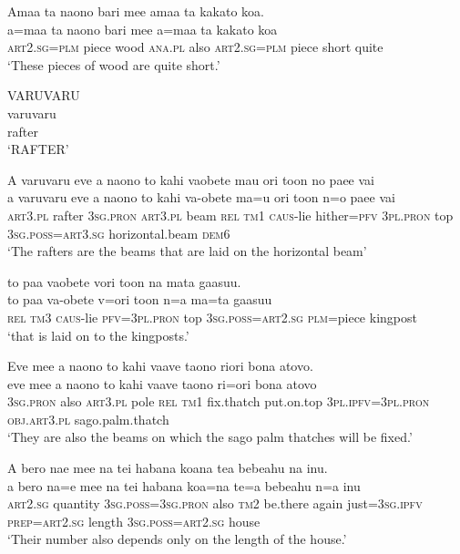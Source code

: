 \ea\label{ex:text11-24}
Amaa ta naono bari mee amaa ta kakato koa.\\
\gll a=maa	ta	naono	bari	mee	a=maa	ta	kakato	koa\\
     \textsc{art}2.\textsc{sg}=\textsc{plm}	piece	wood	\textsc{ana}.\textsc{pl}	also	\textsc{art}2.\textsc{sg}=\textsc{plm}	piece	short	quite\\
\glt `These pieces of wood are quite short.'
\z

\newpage
\ea\label{ex:text11-25}
VARUVARU\\
\gll varuvaru\\
     rafter\\
\glt `RAFTER'
\z

\ea\label{ex:text11-26}
A varuvaru eve a naono to kahi vaobete mau ori toon no paee vai\\
\gll a	varuvaru	eve	a	naono	to	kahi	va-obete	ma=u	ori	toon	n=o	paee	vai\\
     \textsc{art}3.\textsc{pl}	rafter	3\textsc{sg}.\textsc{pron}	\textsc{art}3.\textsc{pl}	beam	\textsc{rel}	\textsc{tm}1	\textsc{caus}-lie	hither=\textsc{pfv}	3\textsc{pl}.\textsc{pron}	top	3\textsc{sg}.\textsc{poss}=\textsc{art}3.\textsc{sg}	horizontal.beam	\textsc{dem}6\\
\glt `The rafters are the beams that are laid on the horizontal beam'
\z

\ea\label{ex:text11-27}
to paa vaobete vori toon na mata gaasuu.\\
\gll to	paa	va-obete	v=ori	toon	n=a	ma=ta	gaasuu\\
     \textsc{rel}	\textsc{tm}3	\textsc{caus}-lie	\textsc{pfv}=3\textsc{pl}.\textsc{pron}	top	3\textsc{sg}.\textsc{poss}=\textsc{art}2.\textsc{sg}	\textsc{plm}=piece	kingpost\\
\glt `that is laid on to the kingposts.'
\z

\ea\label{ex:text11-28}
Eve mee a naono to kahi vaave taono riori bona atovo.\\
\gll eve	mee	a	naono	to	kahi	vaave	taono	ri=ori	bona	atovo\\
     3\textsc{sg}.\textsc{pron}	also	\textsc{art}3.\textsc{pl}	pole	\textsc{rel}	\textsc{tm}1	fix.thatch	put.on.top	3\textsc{pl}.\textsc{ipfv}=3\textsc{pl}.\textsc{pron}	\textsc{obj}.\textsc{art}3.\textsc{pl}	sago.palm.thatch\\
\glt `They are also the beams on which the sago palm thatches will be fixed.'
\z

\ea\label{ex:text11-29}
A bero nae mee na tei habana koana tea bebeahu na inu.\\
\gll a	bero	na=e	mee	na	tei	habana	koa=na	te=a	bebeahu	n=a	inu\\
     \textsc{art}2.\textsc{sg}	quantity	3\textsc{sg}.\textsc{poss}=3\textsc{sg}.\textsc{pron}	also	\textsc{tm}2	be.there	again	just=3\textsc{sg}.\textsc{ipfv}	\textsc{prep}=\textsc{art}2.\textsc{sg}	length	3\textsc{sg}.\textsc{poss}=\textsc{art}2.\textsc{sg}	house\\
\glt `Their number also depends only on the length of the house.'
\z

